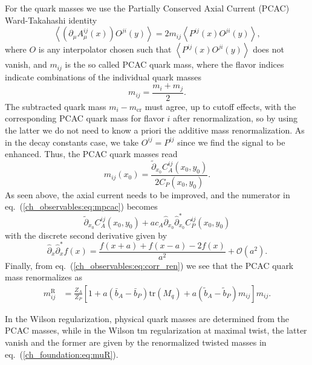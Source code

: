 For the quark masses we use the Partially Conserved Axial Current (PCAC) Ward-Takahashi identity
\begin{equation}
\label{ch_observables:eq:PCAC}
\left<\left(\partial_{\mu}A^{ij}_{\mu}(x)\right)O^{ji}(y)\right>=2m_{ij}\left<P^{ij}(x)O^{ji}(y)\right>,
\end{equation}
where $O$ is any interpolator chosen such that $\left<P^{ij}(x)O^{ji}(y)\right>$ does not vanish, and $m_{ij}$ is the so called PCAC quark mass, where the flavor indices indicate combinations of the individual quark masses
\begin{equation}
m_{ij}=\frac{m_i+m_{j}}{2}.
\end{equation}
The subtracted quark mass $m_{i}-m_{\textrm{cr}}$ must agree, up to cutoff effects, with the corresponding PCAC quark mass for flavor $i$ after renormalization, so by using the latter we do not need to know a priori the additive mass renormalization. As in the decay constants case, we take $O^{ij}=P^{ij}$ since we find the signal to be enhanced. Thus, the PCAC quark masses read
\begin{equation}
\label{ch_observables:eq:mpcac}
m_{ij}(x_0)=\frac{\tilde{\partial}_{x_0}C_A^{ij}(x_0,y_0)}{2C_P(x_0,y_0)}.
\end{equation}
As seen above, the axial current needs to be improved, and the numerator in eq.~(\ref{ch_observables:eq:mpcac}) becomes
\begin{equation}
\tilde{\partial}_{x_0}C_A^{ij}(x_0,y_0)+ac_A\hat{\partial}_{x_0}\hat{\partial}^*_{x_0}C_P^{ij}(x_0,y_0)
\end{equation}
with the discrete second derivative given by
\begin{equation}
\hat{\partial}_{x}\hat{\partial}^*_xf(x)=\frac{f(x+a)+f(x-a)-2f(x)}{a^2}+\mathcal{O}(a^2).
\end{equation}
Finally, from eq.~(\ref{ch_observables:eq:corr_ren}) we see that the PCAC quark mass renormalizes as
\begin{align}
m_{ij}^{\textrm{R}}&=\frac{Z_A}{Z_P}\left[1+a\left(\bar{b}_A-\bar{b}_P\right){\textrm{tr}}\left(M_q\right)+a\left(\tilde{b}_A-\tilde{b}_P\right)m_{ij}\right]m_{ij}.
\end{align}

In the Wilson regularization, physical quark masses are determined from the PCAC masses, while in the Wilson tm regularization at maximal twist, the latter vanish and the former are given by the renormalized twisted masses in eq.~(\ref{ch_foundation:eq:muR}).

